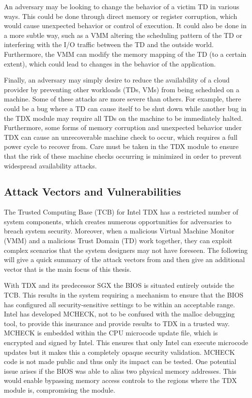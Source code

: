 
An adversary may be looking to change the behavior of a victim TD in various ways. This could be done through direct memory or register corruption, which would cause unexpected behavior or control of execution. It could also be done in a more subtle way, such as a VMM altering the scheduling pattern of the TD or interfering with the I/O traffic between the TD and the outside world. Furthermore, the VMM can modify the memory mapping of the TD (to a certain extent), which could lead to changes in the behavior of the application.


Finally, an adversary may simply desire to reduce the availability of a cloud provider by preventing other workloads (TDs, VMs) from being scheduled on a machine. Some of these attacks are more severe than others. For example, there could be a bug where a TD can cause itself to be shut down while another bug in the TDX module may require all TDs on the machine to be immediately halted. Furthermore, some forms of memory corruption and unexpected behavior under TDX can cause an unrecoverable machine check to occur, which requires a full power cycle to recover from. Care must be taken in the TDX module to ensure that the risk of these machine checks occurring is minimized in order to prevent widespread availability attacks.

\subsection{Attack Vectors and Vulnerabilities}

The Trusted Computing Base (TCB) for Intel TDX has a restricted number of system components, which creates numerous opportunities for adversaries to breach system security. Moreover, when a malicious Virtual Machine Monitor (VMM) and a malicious Trust Domain (TD) work together, they can exploit complex scenarios that the system designers may not have foreseen. The following will give a quick summary of the attack vectors from \cite{aktas_intel_nodate} and then give an additional vector that is the main focus of this thesis.


With TDX and its predecessor SGX the BIOS is situated entirely outside the TCB. This results in the system requiring a mechanism to ensure that the BIOS has configured all security-sensitive settings to be within an acceptable range. Intel has developed MCHECK, not to be confused with the malloc debugging tool, to provide this insurance and provide results to TDX in a trusted way. MCHECK is embedded within the CPU microcode update file, which is encrypted and signed by Intel. This ensures that only Intel can execute microcode updates but it makes this a completely opaque security validation. MCHECK code is not made public and thus only its impact can be tested. One potential issue arises if the BIOS was able to alias two physical memory addresses. This would enable bypassing memory access controls to the regions where the TDX module is, compromising the module. 

